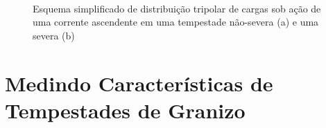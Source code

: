 \begin{figure}[htb]
	\begin{center}
		\caption{Esquema simplificado de distribuição tripolar de cargas sob ação de uma corrente ascendente em uma tempestade não-severa (a) e uma severa (b)} 
		\label{esquema_tripolar}
		 \\
	\end{center}
\end{figure}

\section{Medindo Características de Tempestades de Granizo}

